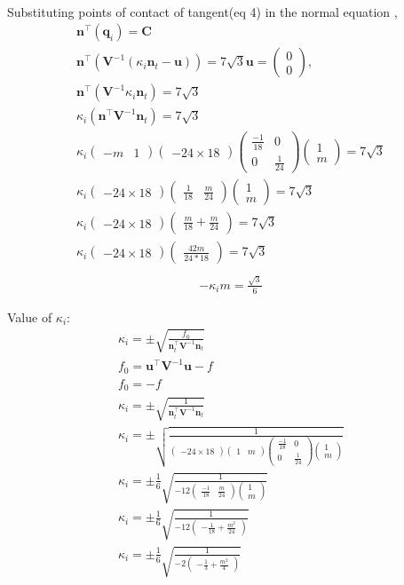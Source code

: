 \documentclass[8pt,a4paper]{report}
\newcommand{\myvec}[1]{\ensuremath{\begin{pmatrix}#1\end{pmatrix}}}
\let\vec\mathbf
\begin{document}
\begin{multicols}{2}
\begin{align}
\end{align}
\raggedright Substituting points of contact of tangent(eq 4) in the normal equation ,
\begin{align*}
 \vec{n}^{\top}(\vec{q}_i) = \textbf{C}\\
 \vec{n}^{\top}(\vec{V}^{-1}(\kappa_i \vec{n}_t-\vec{u}) )= 7\sqrt{3}
 \vec{u}= \myvec{0\\0} ,\\
 \vec{n}^{\top}(\vec{V}^{-1}\kappa_i \vec{n}_t )= 7\sqrt{3}\\
 \kappa_i(\vec{n}^{\top}\vec{V}^{-1}\vec{n}_t) = 7\sqrt{3}\\
\kappa_i\myvec{-m&1}\myvec{-24\times18}\myvec{\frac{-1}{18}&0 \\ 0&\frac{1}{24}}\myvec{1\\m} = 7\sqrt{3}\\
 \kappa_i\myvec{-24\times18}\myvec{\frac{1}{18}&\frac{m}{24}}\myvec{1\\m} =7\sqrt{3}\\
\kappa_i\myvec{-24\times18}\myvec{\frac{m}{18}+\frac{m}{24}} =7\sqrt{3}\\
 \kappa_i\myvec{-24\times18}\myvec{\frac{42m}{24*18}} =7\sqrt{3}\\
\end{align*}
	\begin{align}-\kappa_i m = \frac{\sqrt{3}}{6}\end{align}
\raggedright  Value of $\kappa_i$:\\
\begin{gather*}
      \kappa_i = \pm \sqrt{\frac{f_0}{\vec{n}_t^{\top}\vec{V}^{-1}\vec{n}_t}}\\
           f_0  = \vec{u}^{\top}\vec{V}^{-1}\vec{u}-f \\
                f_0 = -f\\
             \kappa_i  = \pm \sqrt{\frac{1}{ \vec{n}_t^{\top}\vec{V}^{-1}\vec{n}_t}}\\
\kappa_i = \pm \sqrt{\frac{1}{\myvec{-24\times18}\myvec{ 1&m}\myvec{\frac{-1}{18}&0\\0&\frac{1}{24}}\myvec{1\\m}}}\\
   \kappa_i = \pm\frac{1}{6}\sqrt{\frac{1}{-12\myvec{\frac{-1}{18}&\frac{m}{24}}\myvec{1\\m}}}\\
\kappa_i = \pm\frac{1}{6}\sqrt{\frac{1}{-12\myvec{-\frac{1}{18}+\frac{m^2}{24}}}}\\
\kappa_i = \pm\frac{1}{6}\sqrt{\frac{1}{-2\myvec{-\frac{1}{3}+\frac{m^2}{4}}}}

\end{gather*}
\end{multicols}
\end{document}
